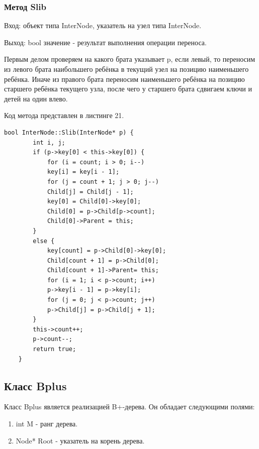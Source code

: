 \documentclass[11pt,a4paper,final]{article} %
\begin{document}
\subsubsection{Метод Slib}
Вход: объект типа InterNode, указатель на узел типа InterNode. \par
Выход: bool значение - результат выполнения операции переноса. \par
Первым делом проверяем на какого брата указывает p, если левый, то переносим из левого брата наибольшего ребёнка в текущий узел на позицию наименьшего ребёнка. Иначе из правого брата переносим наименьшего ребёнка на позицию старшего ребёнка текущего узла, после чего у старшего брата сдвигаем ключи и детей на один влево. \par
Код метода представлен в листинге 21.
\begin{lstlisting}[label=Slib, caption = Метод Slib]
	bool InterNode::Slib(InterNode* p) {
		int i, j;
		if (p->key[0] < this->key[0]) {
			for (i = count; i > 0; i--)
			key[i] = key[i - 1];
			for (j = count + 1; j > 0; j--)
			Child[j] = Child[j - 1];
			key[0] = Child[0]->key[0];
			Child[0] = p->Child[p->count];
			Child[0]->Parent = this;
		}
		else {
			key[count] = p->Child[0]->key[0];
			Child[count + 1] = p->Child[0];
			Child[count + 1]->Parent= this;
			for (i = 1; i < p->count; i++)
			p->key[i - 1] = p->key[i];
			for (j = 0; j < p->count; j++)
			p->Child[j] = p->Child[j + 1];
		}
		this->count++;
		p->count--;
		return true;
	}
\end{lstlisting}

\subsection{Класс Bplus}
Класс Bplus является реализацией B+-дерева. Он обладает следующими полями:
\begin{enumerate}
	\item int M - ранг дерева.
	\item Node* Root - указатель на корень дерева.
\end{enumerate}
\end{document}
